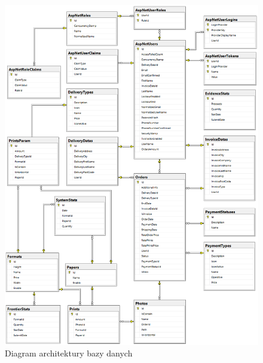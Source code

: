 \begin{figure}[ht]
    \centering
    \includegraphics[width=1\linewidth]{graphics/chapter-4/database-scheme.png}
    \caption{Diagram architektury bazy danych}
    \label{fig:database-scheme}
\end{figure}



